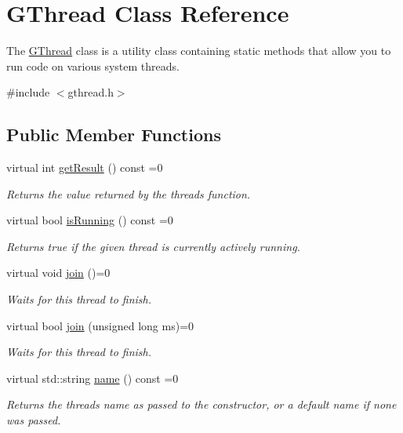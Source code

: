 \hypertarget{classGThread}{}\section{G\+Thread Class Reference}
\label{classGThread}


The \mbox{\hyperlink{classGThread}{G\+Thread}} class is a utility class containing static methods that allow you to run code on various system threads.  




{\ttfamily \#include $<$gthread.\+h$>$}

\subsection*{Public Member Functions}
\begin{DoxyCompactItemize}
\item 
virtual int \mbox{\hyperlink{classGThread_a6cfc0f4e3b2174fde084cd1865f2c9e9}{get\+Result}} () const =0
\begin{DoxyCompactList}\small\item\em Returns the value returned by the thread\textquotesingle{}s function. \end{DoxyCompactList}\item 
virtual bool \mbox{\hyperlink{classGThread_aff473089d979b1e6bab44a61504a0be9}{is\+Running}} () const =0
\begin{DoxyCompactList}\small\item\em Returns true if the given thread is currently actively running. \end{DoxyCompactList}\item 
virtual void \mbox{\hyperlink{classGThread_a93870341d2cd3467df4f193375354be8}{join}} ()=0
\begin{DoxyCompactList}\small\item\em Waits for this thread to finish. \end{DoxyCompactList}\item 
virtual bool \mbox{\hyperlink{classGThread_aeaa664c96a0ace02d44fc791725550a2}{join}} (unsigned long ms)=0
\begin{DoxyCompactList}\small\item\em Waits for this thread to finish. \end{DoxyCompactList}\item 
virtual std\+::string \mbox{\hyperlink{classGThread_a7f04e718c6856c4d3d77a496b6acad0d}{name}} () const =0
\begin{DoxyCompactList}\small\item\em Returns the thread\textquotesingle{}s name as passed to the constructor, or a default name if none was passed. \end{DoxyCompactList}\item 

\end{DoxyCompactItemize}
